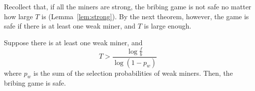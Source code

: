 \documentclass[runningheads]{llncs}
\newcommand{\refuse}{\emph{refuse}}
\begin{document}
Recollect that, if all the miners are strong, the bribing game is not safe no matter how large $T$ is (Lemma~\ref{lem:strong}). By the next theorem, however, the game is safe if there is at least one weak miner, and $T$ is large enough.

%

\begin{theorem}
\label{thm:largeT}
  Suppose there is at least one weak miner, and
  \begin{equation}
  \label{equ:minT}
  T> \frac{\log \frac{f}{b}}{\log (1-p_w)}
  \end{equation}
   where $p_w$ is the sum of the selection probabilities of weak miners. Then, the bribing game is safe. 
\end{theorem}
\end{document}

